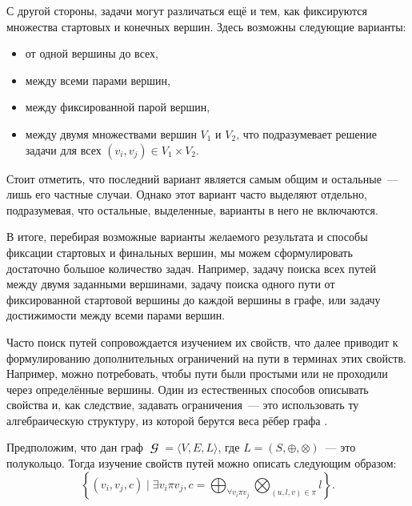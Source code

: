 С другой стороны, задачи могут различаться ещё и тем, как фиксируются множества стартовых и конечных вершин.
Здесь возможны следующие варианты:
\begin{itemize}
    \item от одной вершины до всех,
    \item между всеми парами вершин,
    \item между фиксированной парой вершин,
    \item между двумя множествами вершин $V_1$ и $V_2$, что подразумевает решение задачи для всех $(v_i,v_j) \in V_1 \times V_2$.
\end{itemize}

Стоит отметить, что последний вариант является самым общим и остальные~--- лишь его частные случаи.
Однако этот вариант часто выделяют отдельно, подразумевая, что остальные, выделенные, варианты в него не включаются.

В итоге, перебирая возможные варианты желаемого результата и способы фиксации стартовых и финальных вершин, мы можем сформулировать достаточно большое количество задач.
Например, задачу поиска всех путей между двумя заданными вершинами, задачу поиска одного пути от фиксированной стартовой вершины до каждой вершины в графе, или задачу достижимости между всеми парами вершин.

Часто поиск путей сопровождается изучением их свойств, что далее приводит к формулированию дополнительных ограничений на пути в терминах этих свойств.
Например, можно потребовать, чтобы пути были простыми или не проходили через определённые вершины.
Один из естественных способов описывать свойства и, как следствие, задавать ограничения~--- это использовать ту алгебраическую структуру, из которой берутся веса рёбер графа%
.

Предположим, что дан граф $\mbfscrG = \langle V, E, L\rangle $, где $L = (S, \oplus, \otimes)$~--- это полукольцо.
Тогда изучение свойств путей можно описать следующим образом:
\begin{equation}
    \label{eq:algPathProblem}
    \left\{(v_i, v_j, c) \mid \exists v_i \pi v_j, c = \bigoplus_{\forall v_i \pi v_j} \bigotimes_{(u, l, v) \in \pi } l\right\}.
\end{equation}

